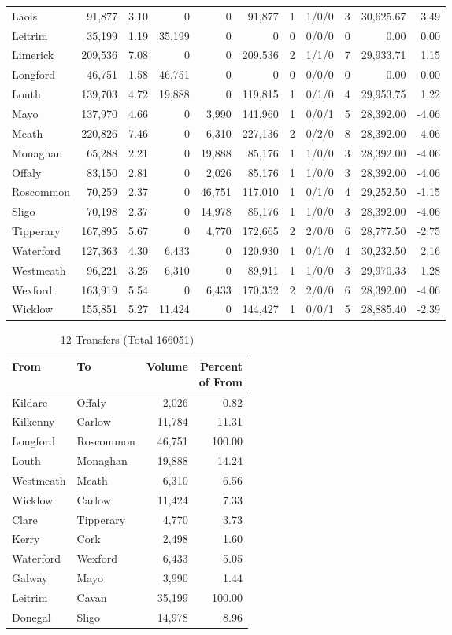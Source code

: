\documentclass[a4paper]{article}
\begin{document}
\begin{longtable}{lrrrrrrlrrr}
Laois&91,877& 3.10&0&0&91,877&1&1/0/0&3&30,625.67& 3.49\\ 
Leitrim&35,199& 1.19&35,199&0&0&0&0/0/0&0& 0.00& 0.00\\ 
Limerick&209,536& 7.08&0&0&209,536&2&1/1/0&7&29,933.71& 1.15\\ 
Longford&46,751& 1.58&46,751&0&0&0&0/0/0&0& 0.00& 0.00\\ 
Louth&139,703& 4.72&19,888&0&119,815&1&0/1/0&4&29,953.75& 1.22\\ 
Mayo&137,970& 4.66&0&3,990&141,960&1&0/0/1&5&28,392.00&-4.06\\ 
Meath&220,826& 7.46&0&6,310&227,136&2&0/2/0&8&28,392.00&-4.06\\ 
Monaghan&65,288& 2.21&0&19,888&85,176&1&1/0/0&3&28,392.00&-4.06\\ 
Offaly&83,150& 2.81&0&2,026&85,176&1&1/0/0&3&28,392.00&-4.06\\ 
Roscommon&70,259& 2.37&0&46,751&117,010&1&0/1/0&4&29,252.50&-1.15\\ 
Sligo&70,198& 2.37&0&14,978&85,176&1&1/0/0&3&28,392.00&-4.06\\ 
Tipperary&167,895& 5.67&0&4,770&172,665&2&2/0/0&6&28,777.50&-2.75\\ 
Waterford&127,363& 4.30&6,433&0&120,930&1&0/1/0&4&30,232.50& 2.16\\ 
Westmeath&96,221& 3.25&6,310&0&89,911&1&1/0/0&3&29,970.33& 1.28\\ 
Wexford&163,919& 5.54&0&6,433&170,352&2&2/0/0&6&28,392.00&-4.06\\ 
Wicklow&155,851& 5.27&11,424&0&144,427&1&0/0/1&5&28,885.40&-2.39\\ 
\end{longtable}

\begin{table}[htbp]
\caption{12 Transfers (Total 166051)}
\centering
\begin{tabular}{llrr} \toprule
From &To &Volume &\shortstack{Percent\\of From} \\ \midrule
Kildare&Offaly&2,026& 0.82\\ 
Kilkenny&Carlow&11,784&11.31\\ 
Longford&Roscommon&46,751&100.00\\ 
Louth&Monaghan&19,888&14.24\\ 
Westmeath&Meath&6,310& 6.56\\ 
Wicklow&Carlow&11,424& 7.33\\ 
Clare&Tipperary&4,770& 3.73\\ 
Kerry&Cork&2,498& 1.60\\ 
Waterford&Wexford&6,433& 5.05\\ 
Galway&Mayo&3,990& 1.44\\ 
Leitrim&Cavan&35,199&100.00\\ 
Donegal&Sligo&14,978& 8.96\\ 
\bottomrule
\end{tabular}
\end{table}
\end{document}
